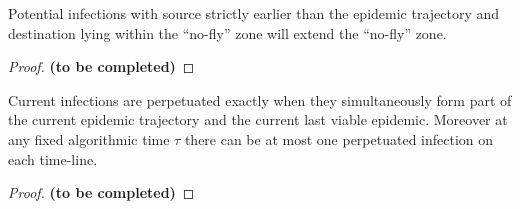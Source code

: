 \documentclass[]{article}
\newcommand{\SIR}{S-I-R\xspace}
\begin{document}
 \begin{lem}\label{lem:infect2}
  Potential infections with source strictly earlier than the epidemic trajectory and destination lying within the ``no-fly'' zone 
  will extend the ``no-fly'' zone.
 \end{lem}
 \begin{proof}
  \textbf{(to be completed)}
 \end{proof}

 \begin{lem}\label{lem:infect3}
  Current infections are perpetuated exactly when they simultaneously form part of the current epidemic trajectory and the current last viable epidemic.
  Moreover at any fixed algorithmic time \(\tau\)  there can be at most one perpetuated infection on each time-line.
 \end{lem}
 \begin{proof}
  \textbf{(to be completed)}
 \end{proof}




 

 
\end{document}
